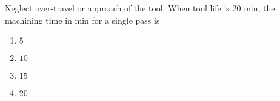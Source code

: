                             \item Neglect over-travel or approach of the tool. When tool life is $20$ min, the machining time in min for a single pass is
                            \begin{enumerate}
                               \item  $5$
                                \item $10$ 
                                \item $15$ 
                                \item $20$
                            \end{enumerate}
                        
                    
                         

